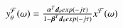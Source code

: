 \ensuremath{
y_{\theta}^{\mathcal{F}}(\omega) 
=
\frac
{
\vecnot{\alpha}^{T}
\vecnot{d}_{\theta}
exp\left(-j\tau\right)
}
{
1
-
\vecnot{\beta}^{T}\vecnot{d}_{\theta}
exp\left(-j\tau\right)
}
x^{\mathcal{F}}(\omega)
}